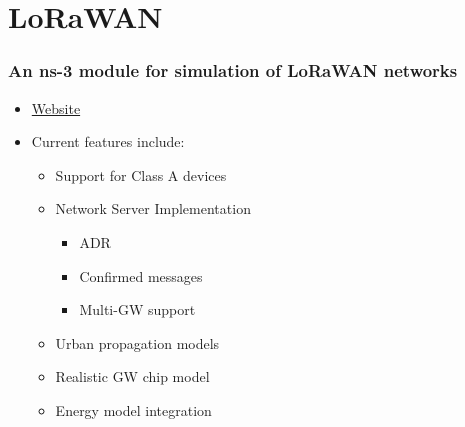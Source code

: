 \documentclass{../iot-lecture}
\begin{document}
\section{LoRaWAN}

\begin{frame}
  \frametitle{An ns-3 module for simulation of LoRaWAN networks}
  \begin{itemize}
    \item \href{https://github.com/signetlabdei/lorawan}{Website}
    \item Current features include:
    \begin{itemize}
      \item Support for Class A devices
      \item Network Server Implementation
      \begin{itemize}
        \item ADR
        \item Confirmed messages
        \item Multi-GW support
      \end{itemize}
      \item Urban propagation models
      \item Realistic GW chip model
      \item Energy model integration
    \end{itemize}
  \end{itemize}
\end{frame}
\end{document}
